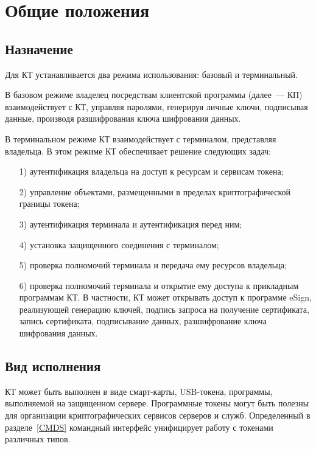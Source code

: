 \chapter{Общие положения}\label{COMMON}

\section{Назначение}

Для КТ устанавливается два режима использования: базовый и терминальный.

В базовом режиме владелец посредствам клиентской 
программы (далее~--- КП) взаимодействует с КТ, 
управляя паролями, генерируя личные ключи, подписывая данные, 
производя разшифрования ключа шифрования данных.

В терминальном режиме КТ взаимодействует с терминалом, представляя владельца.
В этом режиме КТ обеспечивает решение следующих задач: 
\begin{itemize}
\item[1)]
аутентификация владельца на доступ к ресурсам и сервисам токена; 
\item[2)]
управление объектами, размещенными в пределах криптографической границы токена;
\item[3)]
аутентификация терминала и аутентификация перед ним;
\item[4)]
установка защищенного соединения с терминалом;
\item[5)]
проверка полномочий терминала и передача ему ресурсов владельца;
\item[6)]
проверка полномочий терминала и открытие ему доступа к прикладным программам 
КТ. В частности, КТ может открывать доступ к программе eSign, реализующей
генерацию ключей, подпись запроса на получение сертификата, запись 
сертификата, подписывание данных, разшифрование ключа шифрования данных.
\end{itemize}


\section{Вид исполнения} 

КТ может быть выполнен в виде смарт-карты, USB-токена, программы, 
выполняемой на защищенном сервере. Программные токены могут быть полезны 
для организации криптографических сервисов серверов и служб. Определенный 
в разделе~\ref{CMDS} командный интерфейс унифицирует работу с токенами 
различных типов.  


